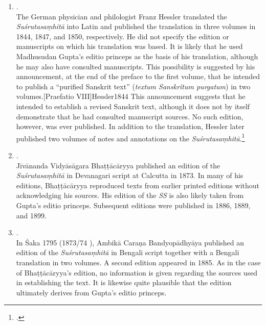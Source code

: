 \documentclass[12pt]{article}
\begin{document}
\begin{enumerate}
	Gupta did not indicate the manuscripts or other sources used in preparing the text. The edition was reprinted in four volumes in Calcutta in 1868, and a second edition in two volumes appeared in 1874.[311]{HIMT}
	
	
	\item \textbf{}.\\
	The German physician and philologist Franz Hessler translated the \emph{Suśrutasaṃhitā} into Latin and published the translation in three volumes in 1844, 1847, and 1850, respectively. He did not specify the edition or manuscripts on which his translation was based. 
	It is likely that he used Madhusudan Gupta's editio princeps as the basis of his translation, although he may also have consulted manuscripts. This possibility is suggested by his announcement, at the end of the preface to the first volume, that he intended to publish a “purified Sanskrit text” (\emph{textum Sanskrǐtum purgatum}) in two volumes.[Praefatio VIII]{Hessler1844} This announcement suggests that he intended to establish a revised Sanskrit text, although it does not by itself demonstrate that he had consulted manuscript sources. No such edition, however, was ever published.
	In addition to the translation, Hessler later published two volumes of notes and annotations on the \emph{Suśrutasaṃhitā}.\footcite{Hessler1852}
	
	
	
	
	\item \textbf{}.\\
	Jīvānanda Vidyāsāgara Bhaṭṭācāryya published an edition of the \emph{Suśrutasaṃhitā} in Devanagari script at Calcutta in 1873. In many of his editions, Bhaṭṭācāryya reproduced texts from earlier printed editions without acknowledging his sources. 
	His edition of the \emph{SS} is also likely taken from Gupta's editio princeps.
	Subsequent editions were published in 1886, 1889, and 1899.
	
	
	
	
	\item \textbf{}.\\
	In Śaka 1795 (1873/74 \AD), Ambikā Caraṇa Bandyopādhyāya published an edition of the \emph{Suśrutasaṃhitā} in Bengali script together with a Bengali translation in two volumes. A second edition appeared in 1885. As in the case of Bhaṭṭācāryya's edition, no information is given regarding the sources used in establishing the text. It is likewise quite plausible that the edition ultimately derives from Gupta's editio princeps. 
	

\end{enumerate}
\end{document}
